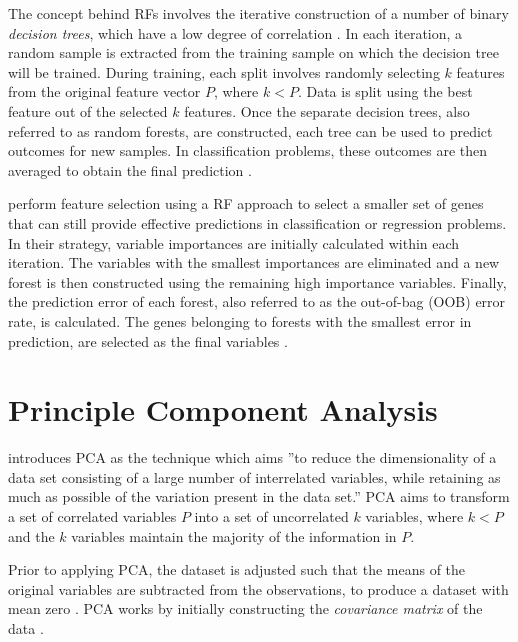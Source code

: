 The concept behind RFs involves the iterative construction of a number of binary \textit{decision trees}, which have a low degree of correlation \citep{Genuer2010}. In each iteration, a random sample is extracted from the training sample on which the decision tree will be trained. During training, each split involves randomly selecting $k$ features from the original feature vector $P$, where $k < P$. Data is split using the best feature out of the selected $k$ features. Once the separate decision trees, also referred to as random forests, are constructed, each tree can be used to predict outcomes for new samples. In classification problems, these outcomes are then averaged to obtain the final prediction \citep{kuhn2013applied}. 

\citet{Diaz-Uriarte2006} perform feature selection using a RF approach to select a smaller set of genes that can still provide effective predictions in classification or regression problems. In their strategy, variable importances are initially calculated within each iteration. The variables with the smallest importances are eliminated and a new forest is then constructed using the remaining high importance variables. Finally, the prediction error of each forest, also referred to as the out-of-bag (OOB) error rate, is calculated. The genes belonging to forests with the smallest error in prediction, are selected as the final variables \citep{Diaz-Uriarte2006}.

\section{Principle Component Analysis}

\citet{jolliffe2002principal} introduces PCA as the technique which aims ''to reduce the dimensionality of a data set consisting of a large number of interrelated variables, while retaining as much as possible of the variation present in the data set.'' PCA aims to transform a set of correlated variables $P$ into a set of uncorrelated $k$ variables, where $k < P$ and the $k$ variables maintain the majority of the information in $P$. 

Prior to applying PCA, the dataset is adjusted such that the means of the original variables are subtracted from the observations, to produce a dataset with mean zero \citep{jackson2005user}. PCA works by initially constructing the \textit{covariance matrix} of the data \citep{Guan2009}.

